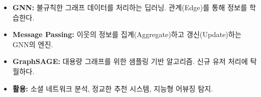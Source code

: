 \documentclass[11pt,a4paper]{book}
\theoremstyle{definition}
\begin{document}
\begin{summarybox}[title={Module 5 (Part B) 핵심 요약}]
\begin{itemize}
    \item \textbf{GNN:} 불규칙한 그래프 데이터를 처리하는 딥러닝. 관계(Edge)를 통해 정보를 학습한다.
    \item \textbf{Message Passing:} 이웃의 정보를 집계(Aggregate)하고 갱신(Update)하는 GNN의 엔진.
    \item \textbf{GraphSAGE:} 대용량 그래프를 위한 샘플링 기반 알고리즘. 신규 유저 처리에 탁월하다.
    \item \textbf{활용:} 소셜 네트워크 분석, 정교한 추천 시스템, 지능형 어뷰징 탐지.
\end{itemize}
\end{summarybox}
\end{document}
